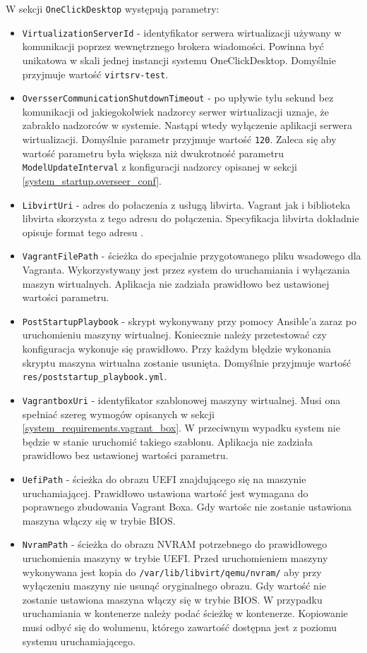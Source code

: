 \documentclass[../opis-rozwiazania.tex]{subfiles}
\begin{document}
W sekcji \texttt{OneClickDesktop} występują parametry:
\begin{itemize}
  \item \texttt{VirtualizationServerId} - identyfikator serwera wirtualizacji używany w komunikacji poprzez wewnętrznego brokera wiadomości. Powinna być unikatowa w skali jednej instancji systemu OneClickDesktop. Domyślnie przyjmuje wartość \texttt{virtsrv-test}.
  \item \texttt{OversserCommunicationShutdownTimeout} - po upływie tylu sekund bez komunikacji od jakiegokolwiek nadzorcy serwer wirtualizacji uznaje, że zabrakło nadzorców w systemie. Nastąpi wtedy wyłączenie aplikacji serwera wirtualizacji. Domyślnie parametr przyjmuje wartość \texttt{120}. Zaleca się aby wartość parametru była większa niż dwukrotność parametru \texttt{ModelUpdateInterval} z konfiguracji nadzorcy opisanej w sekcji \ref{system_startup.overseer_conf}.
  \item \texttt{LibvirtUri} - adres do połaczenia z usługą libvirta. Vagrant jak i biblioteka libvirta skorzysta z tego adresu do połączenia. Specyfikacja libvirta dokładnie opisuje format tego adresu \parencite{libvirt-uri}.
  \item \texttt{VagrantFilePath} - ścieżka do specjalnie przygotowanego pliku wsadowego dla Vagranta. Wykorzystywany jest przez system do uruchamiania i wyłączania maszyn wirtualnych. Aplikacja nie zadziała prawidłowo bez ustawionej wartości parametru.
  \item \texttt{PostStartupPlaybook} - skrypt wykonywany przy pomocy Ansible'a zaraz po uruchomieniu maszyny wirtualnej. Koniecznie należy przetestować czy konfiguracja wykonuje się prawidłowo. Przy każdym błędzie wykonania skryptu maszyna wirtualna zostanie usunięta. Domyślnie przyjmuje wartość \texttt{res/poststartup\_playbook.yml}.
  \item \texttt{VagrantboxUri} - identyfikator szablonowej maszyny wirtualnej. Musi ona spełniać szereg wymogów opisanych w sekcji \ref{system_requirements.vagrant_box}. W przeciwnym wypadku system nie będzie w stanie uruchomić takiego szablonu. Aplikacja nie zadziała prawidłowo bez ustawionej wartości parametru.
  \item \texttt{UefiPath} - ścieżka do obrazu UEFI znajdującego się na maszynie uruchamiającej. Prawidłowo ustawiona wartość jest wymagana do poprawnego zbudowania Vagrant Boxa. Gdy wartośc nie zostanie ustawiona maszyna włączy się w trybie BIOS.
  \item \texttt{NvramPath} - ścieżka do obrazu NVRAM potrzebnego do prawidłowego uruchomienia maszyny w trybie UEFI. Przed uruchomieniem maszyny wykonywana jest kopia do \texttt{/var/lib/libvirt/qemu/nvram/} aby przy wyłączeniu maszyny nie usunąć oryginalnego obrazu.  Gdy wartość nie zostanie ustawiona maszyna włączy się w trybie BIOS. W przypadku uruchamiania w kontenerze należy podać ścieżkę w kontenerze. Kopiowanie musi odbyć się do wolumenu, którego zawartość dostępna jest z poziomu systemu uruchamiającego.

\end{itemize}
\end{document}
